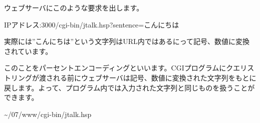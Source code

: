 \documentclass[a4paper,12pt,dvipdfmx]{jarticle}
\begin{document}
\bigskip

%


ウェブサーバにこのような要求を出します。

IPアドレス:3000/cgi-bin/jtalk.hsp?sentence=こんにちは

実際には”こんにちは”という文字列はURL内ではあるにって記号、数値に変換されています。

このことをパーセントエンコーディングといいます。CGIプログラムにクエリストリングが渡される前にウェブサーバは記号、数値に変換された文字列をもとに戻します。よって、プログラム内では入力された文字列と同じものを扱うことができます。

{\textasciitilde}/07/www/cgi-bin/jtalk.hsp

\centering
\end{document}
